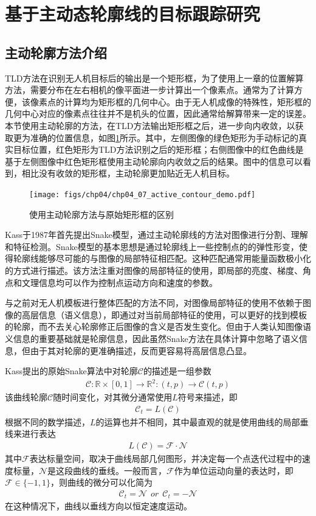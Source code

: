 \section{基于主动态轮廓线的目标跟踪研究}
\subsection{主动轮廓方法介绍}
TLD方法在识别无人机目标后的输出是一个矩形框，为了使用上一章的位置解算方法，需要分布在左右相机的像平面进一步计算出一个像素点。通常为了计算方便，该像素点的计算均为矩形框的几何中心。由于无人机成像的特殊性，矩形框的几何中心对应的像素点往往并不是机头的位置，因此通常给解算带来一定的误差。本节使用主动轮廓的方法，在TLD方法输出矩形框之后，进一步向内收敛，以获取更为准确的位置信息，如图\ref{fig:chp04_07_active_contour_demo}所示。其中，左侧图像的绿色矩形为手动标记的真实目标位置，红色矩形为TLD方法识别之后的矩形框；右侧图像中的红色曲线是基于左侧图像中红色矩形框使用主动轮廓向内收敛之后的结果。图中的信息可以看到，相比没有收敛的矩形框，主动轮廓更加贴近无人机目标。

\begin{figure}[ht]   
	\centering
	\texttt{[image: figs/chp04/chp04\_07\_active\_contour\_demo.pdf]}
	\caption{使用主动轮廓方法与原始矩形框的区别}
	\label{fig:chp04_07_active_contour_demo}
\end{figure}

Kass于1987年首先提出Snake模型\cite{kass1988snakes}，通过主动轮廓线的方法对图像进行分割、理解和特征检测。Snake模型的基本思想是通过轮廓线上一些控制点的的弹性形变，使得轮廓线能够尽可能的与图像的局部特征相匹配。这种匹配通常用能量函数极小化的方式进行描述。该方法注重对图像的局部特征的使用，即局部的亮度、梯度、角点和文理信息均可以作为控制点运动方向和速度的参数。

与之前对无人机模板进行整体匹配的方法不同，对图像局部特征的使用不依赖于图像的高层信息（语义信息），即通过对当前局部特征的使用，可以更好的找到模板的轮廓，而不去关心轮廓修正后图像的含义是否发生变化。但由于人类认知图像语义信息的重要基础就是轮廓信息，因此虽然Snake方法在具体计算中忽略了语义信息，但由于其对轮廓的更准确描述，反而更容易将高层信息凸显。

Kass提出的原始Snake算法中对轮廓$\mathcal{C}$的描述是一组参数
\begin{align}
\mathcal{C}:\mathbb{R} \times [0,1] \rightarrow \mathbb{R}^2:(t,p) \rightarrow \mathcal{C}(t,p)
\end{align}
该曲线轮廓$\mathcal{C}$随时间变化，对其微分通常使用$L$符号来描述，即
\begin{align}
\mathcal{C}_t =L(\mathcal{C})
\end{align}
根据不同的数学描述，$L$的运算也并不相同，其中最直观的就是使用曲线的局部垂线来进行表达
\begin{align}
L(\mathcal{C}) = \mathcal{F} \cdot \mathcal{N}
\end{align}
其中$\mathcal{F}$表达标量空间，取决于曲线局部几何图形，并决定每一个点迭代过程中的速度标量，$\mathcal{N}$是这段曲线的垂线。一般而言，$\mathcal{F}$作为单位运动向量的表达时，即$\mathcal{F} \in \{-1, 1\}$，则曲线的微分可以化简为
\begin{align}
\mathcal{C}_t = \mathcal{N}\ \ or\  \ \mathcal{C}_t= -\mathcal{N}
\end{align}
在这种情况下，曲线以垂线方向以恒定速度运动。

